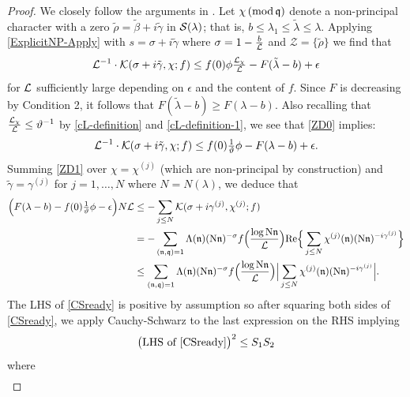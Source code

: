 \documentclass[12pt,psamsfonts]{amsart}
\theoremstyle{definition}
\theoremstyle{remark}
\numberwithin{equation}{section}
\begin{document}
\begin{proof} We closely follow the arguments in \cite[Section 12]{HBLinnik}. Let $\chi \, (\mathrm{mod} {\, \mathfrak{q}})$ denote a non-principal character with a zero $\tilde{\rho} = \tilde{\beta} + i\tilde{\gamma}$ in $\mathcal{S}(\lambda)$; that is, $b \leq \lambda_1 \leq \tilde{\lambda} \leq \lambda.$
Applying \cref{ExplicitNP-Apply} with $s = \sigma+i\tilde{\gamma}$ where $\sigma = 1- \tfrac{b}{\mathcal{L}}$ and $\mathcal{Z} = \{ \tilde{\rho}\}$ we find that
\begin{equation}
 \mathcal{L}^{-1} \cdot \mathcal{K}(\sigma + i\tilde{\gamma}, \chi; f)  \leq f(0) \phi \tfrac{\mathcal{L}_{\chi}}{\mathcal{L}}   - F(\tilde{\lambda}-b)+ \epsilon
\label{ZD0} 
\end{equation}
for $\mathcal{L}$ sufficiently large depending on $\epsilon$ and the content of $f$.  Since $F$ is decreasing by Condition 2,  it follows that 
$F(\tilde{\lambda}-b) \geq F(\lambda-b).$ Also recalling  that $\tfrac{\mathcal{L}_{\chi}}{\mathcal{L}} \leq \vartheta^{-1}$ by \eqref{cL-definition} and \eqref{cL-definition-1}, we see that \eqref{ZD0} implies:
\begin{equation} 
\mathcal{L}^{-1} \cdot \mathcal{K}(\sigma + i\tilde{\gamma}, \chi; f) \leq  
 f(0) \tfrac{1}{\vartheta} \phi  - F(\lambda-b) + \epsilon. 
\label{ZD1}
\end{equation}
Summing \eqref{ZD1} over $\chi = \chi^{(j)}$ (which are non-principal by construction) and $\tilde{\gamma} = \gamma^{(j)}$ for $j=1,\dots,N$ where $N = N (\lambda)$, we deduce that
\begin{equation}
\begin{aligned}
\Big( F(\lambda-b) - f(0)\tfrac{1}{\vartheta}\phi - \epsilon \Big) N \mathcal{L} &  \leq   -\sum_{j \leq N} \mathcal{K}(\sigma+i\gamma^{(j)}, \chi^{(j)}; f) \\
& = -\sum_{(\mathfrak{n},\mathfrak{q}) =1} \Lambda(\mathfrak{n}) (\mathrm{N}\mathfrak{n})^{-\sigma} f\Big( \frac{\log \mathrm{N}\mathfrak{n}}{\mathcal{L}}\Big) \mathrm{Re}\Big\{ \sum_{j \leq N} \chi^{(j)}(\mathfrak{n}) (\mathrm{N}\mathfrak{n})^{-i\gamma^{(j)}} \Big\} \\
& \leq \sum_{(\mathfrak{n},\mathfrak{q}) =1} \Lambda(\mathfrak{n}) (\mathrm{N}\mathfrak{n})^{-\sigma} f\Big( \frac{\log \mathrm{N}\mathfrak{n}}{\mathcal{L}}\Big) \Big| \sum_{j \leq N} \chi^{(j)}(\mathfrak{n}) (\mathrm{N}\mathfrak{n})^{-i\gamma^{(j)}} \Big|. \\
\end{aligned}
\label{CSready}
\end{equation}
The LHS of \eqref{CSready} is positive by assumption so after squaring both sides of \eqref{CSready}, we apply Cauchy-Schwarz to the last expression on the RHS implying
\[
\big(\text{LHS of \eqref{CSready}}\big)^2 \leq \displaystyle S_1 S_2
\]
where
\begin{align*}

\end{align*}
\end{proof}
\end{document}
